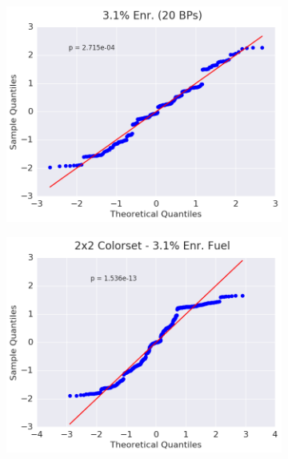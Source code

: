 \begin{figure}[h!]
\begin{subfigure}{0.5\textwidth}
  \centering
  \includegraphics[width=\linewidth]{figures/patterns/assm-3.1-20BPs/quantile/assm-31-20BPs-fiss-2}
  \caption{}
  \label{fig:chap9-qq-assm-3.1-20BPs-fiss}
\end{subfigure}%
\begin{subfigure}{0.5\textwidth}
  \centering
  \includegraphics[width=\linewidth]{figures/patterns/2x2/quantile/31-enr-fiss-2}
  \caption{}
  \label{fig:chap9-qq-2x2-3.1-fiss}
\end{subfigure}
\begin{subfigure}{0.5\textwidth}
  \centering

\end{subfigure}
\end{figure}
